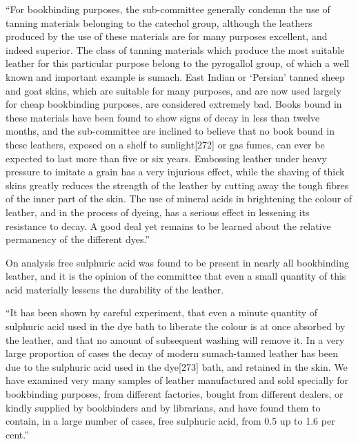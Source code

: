 \documentclass[
]{article}
\begin{document}
``For bookbinding purposes, the sub-committee generally condemn the use
of tanning materials belonging to the catechol group, although the
leathers produced by the use of these materials are for many purposes
excellent, and indeed superior. The class of tanning materials which
produce the most suitable leather for this particular purpose belong to
the pyrogallol group, of which a well known and important example is
sumach. East Indian or `Persian' tanned sheep and goat skins, which are
suitable for many purposes, and are now used largely for cheap
bookbinding purposes, are considered extremely bad. Books bound in these
materials have been found to show signs of decay in less than twelve
months, and the sub-committee are inclined to believe that no book bound
in these leathers, exposed on a shelf to
sunlight{\protect\hypertarget{Page_272}{}{{[}272{]}}} or gas fumes, can
ever be expected to last more than five or six years. Embossing leather
under heavy pressure to imitate a grain has a very injurious effect,
while the shaving of thick skins greatly reduces the strength of the
leather by cutting away the tough fibres of the inner part of the skin.
The use of mineral acids in brightening the colour of leather, and in
the process of dyeing, has a serious effect in lessening its resistance
to decay. A good deal yet remains to be learned about the relative
permanency of the different dyes.''

On analysis free sulphuric acid was found to be present in nearly all
bookbinding leather, and it is the opinion of the committee that even a
small quantity of this acid materially lessens the durability of the
leather.

``It has been shown by careful experiment, that even a minute quantity
of sulphuric acid used in the dye bath to liberate the colour is at once
absorbed by the leather, and that no amount of subsequent washing will
remove it. In a very large proportion of cases the decay of modern
sumach-tanned leather has been due to the sulphuric acid used in the
dye{\protect\hypertarget{Page_273}{}{{[}273{]}}} bath, and retained in
the skin. We have examined very many samples of leather manufactured and
sold specially for bookbinding purposes, from different factories,
bought from different dealers, or kindly supplied by bookbinders and by
librarians, and have found them to contain, in a large number of cases,
free sulphuric acid, from 0.5 up to 1.6 per cent.''
\end{document}
